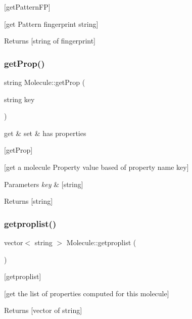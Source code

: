 \mbox{[}get\+Pattern\+FP\mbox{]} 

\mbox{[}get Pattern fingerprint string\mbox{]}

\begin{DoxyReturn}{Returns}
\mbox{[}string of fingerprint\mbox{]} 
\end{DoxyReturn}
\mbox{\label{class_molecule_ad465fbdb8c43e8280e4dcf3eefac1e13}} 
\subsubsection{\texorpdfstring{get\+Prop()}{getProp()}}
{\footnotesize\ttfamily string Molecule\+::get\+Prop (\begin{DoxyParamCaption}\item[{string}]{key }\end{DoxyParamCaption})}



get \& set \& has properties 

\mbox{[}get\+Prop\mbox{]}

\mbox{[}get a molecule Property value based of property name key\mbox{]}


\begin{DoxyParams}{Parameters}
{\em key} & \mbox{[}string\mbox{]} \\
\hline
\end{DoxyParams}
\begin{DoxyReturn}{Returns}
\mbox{[}string\mbox{]} 
\end{DoxyReturn}
\mbox{\label{class_molecule_a5296c86bec78924d64bc2a9472eb91d5}} 
\subsubsection{\texorpdfstring{getproplist()}{getproplist()}}
{\footnotesize\ttfamily vector$<$ string $>$ Molecule\+::getproplist (\begin{DoxyParamCaption}{ }\end{DoxyParamCaption})}



\mbox{[}getproplist\mbox{]} 

\mbox{[}get the list of properties computed for this molecule\mbox{]} \begin{DoxyReturn}{Returns}
\mbox{[}vector of string\mbox{]} 
\end{DoxyReturn}
\mbox{\label{class_molecule_ac60dca92ffb9d756a56b95af1a797022}} 
